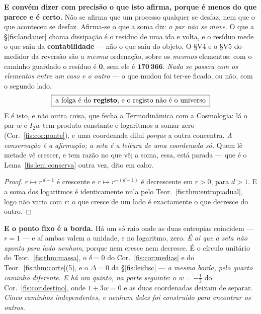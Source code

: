 \documentclass[livro.tex]{subfiles}
\begin{document}
\medskip\noindent\textbf{E convém dizer com precisão o que isto afirma, porque é
menos do que parece e é certo.} Não se afirma que um processo qualquer se desfaz,
nem que o que aconteceu se desfaz. Afirma-se o que a soma diz: \emph{o par não se
move}. O que a §\ref{fis:landauer} chama dissipação é o resíduo de uma ida e
volta, e o resíduo mede o que saiu da \textbf{contabilidade} --- não o que saiu do
objeto. O §V4 e o §V5 do medidor da reversão são a \emph{mesma} ordenação, sobre
os \emph{mesmos} elementos: com o caminho guardado o resíduo é $\mathbf{0}$, sem
ele é $\mathbf{170\,366}$. \emph{Nada se passou com os elementos entre um caso e
o outro} --- o que mudou foi ter-se ficado, ou não, com o segundo lado.
\[
\boxed{\;\text{a folga é do \textbf{registo}, e o registo não é o universo}\;}
\]
E é isto, e não outra coisa, que fecha a Termodinâmica com a Cosmologia: lá o par
$w$ e $I_2w$ tem produto constante e logaritmos a somar zero
(Cor.~\ref{fis:cor:ponte}), e uma coordenada dilui \emph{porque} a outra
concentra. \emph{A conservação é a afirmação; a seta é a leitura de uma
coordenada só.} Quem lê metade vê crescer, e tem razão no que vê; a soma, essa,
está parada --- que é o Lema~\ref{fis:lem:conserva} outra vez, dito em calor.
\begin{proof}
$r\mapsto r^{\,d-1}$ é crescente e $r\mapsto r^{-(d-1)}$ é decrescente em $r>0$,
para $d>1$. E a soma dos logaritmos é identicamente nula pelo
Teor.~\ref{fis:thm:entropiadual}, logo não varia com $r$: o que cresce de um lado
é exactamente o que decresce do outro.
\end{proof}

\medskip\noindent\textbf{E o ponto fixo é a borda.} Há um só raio onde as duas
entropias coincidem --- $r=1$ --- e aí ambas valem a unidade, e no logaritmo,
zero. \emph{É aí que a seta não aponta para lado nenhum}, porque nem cresce nem
decresce. É o círculo unitário do Teor.~\ref{fis:thm:massa}, o $\delta=0$ do
Cor.~\ref{fis:cor:medias} e do Teor.~\ref{fis:thm:corte}(5), e o $\Delta=0$ da
§\ref{fis:leidisc} --- \emph{a mesma borda, pelo quarto caminho diferente. E há
um quinto, na parte seguinte}: o $w=-\tfrac13$ do Cor.~\ref{fis:cor:destino},
onde $1+3w=0$ e as duas coordenadas deixam de separar. \emph{Cinco caminhos
independentes, e nenhum deles foi construído para encontrar os outros.}
\end{document}
